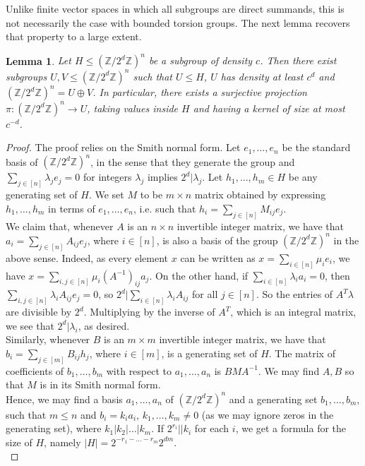 \documentclass[a4paper,11pt]{article}
\numberwithin{theorem}{section}
\newtheorem{lemma}[theorem]{Lemma}
\theoremstyle{definition}
\begin{document}
Unlike finite vector spaces in which all subgroups are direct summands, this is not necessarily the case with bounded torsion groups. The next lemma recovers that property to a large extent.

\begin{lemma}\label{directsummandstorsion}
    Let $H \leq (\mathbb{Z}/2^d\mathbb{Z})^n$ be a subgroup of density $c$. Then there exist subgroups $U, V \leq (\mathbb{Z}/2^d\mathbb{Z})^n$ such that $U \leq H$, $U$ has density at least $c^d$ and $(\mathbb{Z}/2^d\mathbb{Z})^n = U \oplus V$. In particular, there exists a surjective projection $\pi : (\mathbb{Z}/2^d\mathbb{Z})^n \to U$, taking values inside $H$ and having a kernel of size at most $c^{-d}$.
\end{lemma}

\begin{proof}
    The proof relies on the Smith normal form. Let $e_1, \dots, e_n$ be the standard basis of $(\mathbb{Z}/2^d\mathbb{Z})^n$, in the sense that they generate the group and $\sum_{j \in [n]} \lambda_j e_j = 0$ for integers $\lambda_j$ implies $2^d | \lambda_j$. Let $h_1, \dots, h_m \in H$ be any generating set of $H$. We set $M$ to be $m \times n$ matrix obtained by expressing $h_1, \dots, h_m$ in terms of $e_1, \dots, e_n$, i.e. such that $h_i = \sum_{j \in [n]} M_{ij} e_j$.\\
    \indent We claim that, whenever $A$ is an $n \times n$ invertible integer matrix, we have that $a_i = \sum_{j \in [n]} A_{i j} e_j$, where $i \in [n]$, is also a basis of the group $(\mathbb{Z}/2^d\mathbb{Z})^n$ in the above sense. Indeed, as every element $x$ can be written as $x = \sum_{i \in [n]} \mu_i e_i$, we have $x = \sum_{i, j \in [n]} \mu_i(A^{-1})_{ij} a_j$. On the other hand, if $\sum_{i \in [n]} \lambda_i a_i = 0$, then $\sum_{i, j \in [n]} \lambda_i A_{i j} e_j= 0$, so $2^d | \sum_{i \in [n]} \lambda_i A_{i j}$ for all $j \in [n]$. So the entries of $A^T \lambda$ are divisible by $2^d$. Multiplying by the inverse of $A^T$, which is an integral matrix, we see that $2^d | \lambda_i$, as desired.\\
    \indent Similarly, whenever $B$ is an $m \times m$ invertible integer matrix, we have that $b_i = \sum_{j \in [m]} B_{i j} h_j$, where $i \in [m]$, is a generating set of $H$. The matrix of coefficients of $b_1, \dots, b_m$ with respect to $a_1, \dots, a_n$ is $BMA^{-1}$. We may find $A, B$ so that $M$ is in its Smith normal form.\\
    \indent Hence, we may find a basis $a_1, \dots, a_n$ of $(\mathbb{Z}/2^d\mathbb{Z})^n$ and a generating set $b_1, \dots, b_m$, such that $m \leq n$ and $b_i = k_i a_i$, $k_1, \dots, k_m \not= 0$ (as we may ignore zeros in the generating set), where $k_1 | k_2 | \dots | k_m$. If $2^{r_i}||k_i$ for each $i$, we get a formula for the size of $H$, namely $|H| = 2^{-r_1 - \dots -r_m} 2^{dm}$.\\

\end{proof}
\end{document}
